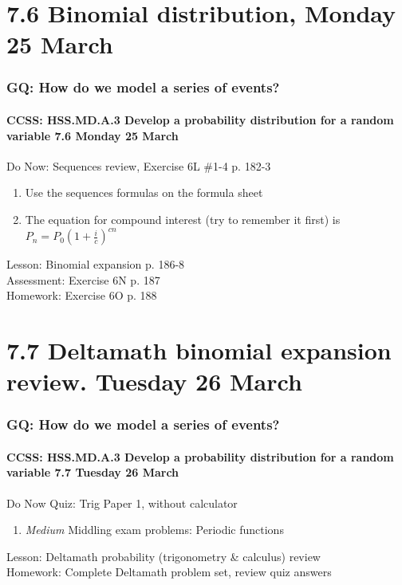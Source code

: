 \documentclass{beamer}
\begin{document}
\section{7.6 Binomial distribution, Monday 25 March}
  \frame
  {
    \frametitle{GQ: How do we model a series of events?}
    \framesubtitle{CCSS: HSS.MD.A.3 Develop a probability distribution for a random variable \hfill \alert{7.6 Monday 25 March}}

    \begin{block}{Do Now: Sequences review, Exercise 6L \#1-4 p. 182-3}
    \begin{enumerate}
        \item Use the sequences formulas on the formula sheet
        \item The equation for compound interest (try to remember it first) is $P_n=P_0(1+\frac{i}{c})^{cn}$
    \end{enumerate}
    \end{block}
    Lesson:  Binomial expansion p. 186-8\\
    Assessment: Exercise 6N p. 187\\%
    Homework: Exercise 6O p. 188
  }

\section{7.7 Deltamath binomial expansion review. Tuesday 26 March}
  \frame
  {
    \frametitle{GQ: How do we model a series of events?}
    \framesubtitle{CCSS: HSS.MD.A.3 Develop a probability distribution for a random variable \hfill \alert{7.7 Tuesday 26 March}}

    \begin{block}{Do Now Quiz: Trig Paper 1, without calculator}
    \begin{enumerate}
        \item \emph{Medium} Middling exam problems: Periodic functions
    \end{enumerate}
    \end{block}

    Lesson: Deltamath probability (trigonometry \& calculus) review\\
    Homework: Complete Deltamath problem set, review quiz answers
  }
\end{document}
